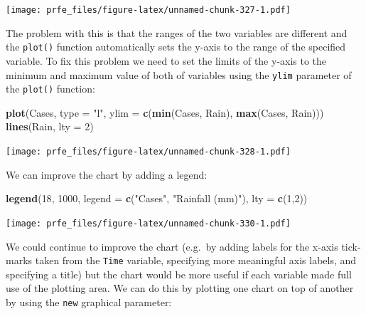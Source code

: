 \documentclass[12pt,]{book}
\newenvironment{Shaded}{\begin{snugshade}}{\end{snugshade}}
\newcommand{\KeywordTok}[1]{\textcolor[rgb]{0.13,0.29,0.53}{\textbf{#1}}}
\newcommand{\DataTypeTok}[1]{\textcolor[rgb]{0.13,0.29,0.53}{#1}}
\newcommand{\DecValTok}[1]{\textcolor[rgb]{0.00,0.00,0.81}{#1}}
\newcommand{\StringTok}[1]{\textcolor[rgb]{0.31,0.60,0.02}{#1}}
\newcommand{\NormalTok}[1]{#1}
\theoremstyle{definition}
\theoremstyle{definition}
\theoremstyle{definition}
\theoremstyle{remark}
\begin{document}
\texttt{[image: prfe\_files/figure-latex/unnamed-chunk-327-1.pdf]}

The problem with this is that the ranges of the two variables are
different and the \texttt{plot()} function automatically sets the y-axis
to the range of the specified variable. To fix this problem we need to
set the limits of the y-axis to the minimum and maximum value of both of
variables using the \texttt{ylim} parameter of the \texttt{plot()}
function:

\begin{Shaded}
\begin{Highlighting}[]
\KeywordTok{plot}\NormalTok{(Cases, }\DataTypeTok{type =} \StringTok{"l"}\NormalTok{, }\DataTypeTok{ylim =} \KeywordTok{c}\NormalTok{(}\KeywordTok{min}\NormalTok{(Cases, Rain), }\KeywordTok{max}\NormalTok{(Cases, Rain)))}
\KeywordTok{lines}\NormalTok{(Rain, }\DataTypeTok{lty =} \DecValTok{2}\NormalTok{)}
\end{Highlighting}
\end{Shaded}

\texttt{[image: prfe\_files/figure-latex/unnamed-chunk-328-1.pdf]}

We can improve the chart by adding a legend:

\begin{Shaded}
\begin{Highlighting}[]
\KeywordTok{legend}\NormalTok{(}\DecValTok{18}\NormalTok{, }\DecValTok{1000}\NormalTok{, }\DataTypeTok{legend =} \KeywordTok{c}\NormalTok{(}\StringTok{"Cases"}\NormalTok{, }\StringTok{"Rainfall (mm)"}\NormalTok{), }\DataTypeTok{lty =} \KeywordTok{c}\NormalTok{(}\DecValTok{1}\NormalTok{,}\DecValTok{2}\NormalTok{))}
\end{Highlighting}
\end{Shaded}

\texttt{[image: prfe\_files/figure-latex/unnamed-chunk-330-1.pdf]}

We could continue to improve the chart (e.g.~by adding labels for the
x-axis tick-marks taken from the \texttt{Time} variable, specifying more
meaningful axis labels, and specifying a title) but the chart would be
more useful if each variable made full use of the plotting area. We can
do this by plotting one chart on top of another by using the
\texttt{new} graphical parameter:
\end{document}
